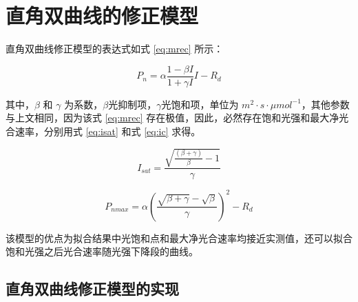 \documentclass[
]{krantz}
\begin{document}
\hypertarget{rev_rec}{%
\section{直角双曲线的修正模型}\label{rev_rec}}

\citet{YEZiPiao2010} 直角双曲线修正模型的表达式如式 \eqref{eq:mrec} 所示：

\begin{equation}
P_{n} = \alpha \frac{1-\beta I}{1+\gamma I} I - R_{d}
\label{eq:mrec}
\end{equation}

其中，\(\beta\) 和 \(\gamma\) 为系数，\(\beta\)光抑制项，\(\gamma\)光饱和项，单位为
\(m^{2}\cdot s\cdot\mu mol^{-1}\)，其他参数与上文相同，因为该式 \eqref{eq:mrec}
存在极值，因此，必然存在饱和光强和最大净光合速率，分别用式 \eqref{eq:isat} 和式 \eqref{eq:ic} 求得。

\begin{equation}
I_{sat} = \frac{\sqrt{\frac{(\beta+\gamma)}{\beta}-1}}{\gamma}
\label{eq:isat}
\end{equation}

\begin{equation}
P_{nmax} = \alpha\left(\frac{\sqrt{\beta+\gamma}-\sqrt{\beta}}{\gamma}\right)^{2}-R_{d}
\label{eq:ic}
\end{equation}

该模型的优点为拟合结果中光饱和点和最大净光合速率均接近实测值，还可以拟合饱和光强之后光合速率随光强下降段的曲线。

\hypertarget{rev_rec_exam}{%
\subsection{直角双曲线修正模型的实现}\label{rev_rec_exam}}
\end{document}
